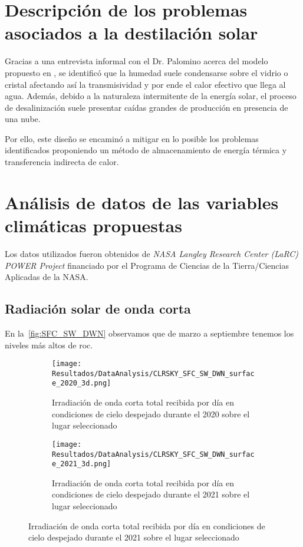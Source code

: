 	\section{Descripción de los problemas asociados a la destilación solar}
		
		Gracias a una entrevista informal con el Dr. Palomino acerca del modelo propuesto en \cite{palomino-resendiz_design_2018}, se identificó que la humedad suele condensarse sobre el vidrio o cristal afectando así la transmisividad y por ende el calor efectivo que llega al agua. Además, debido a la naturaleza intermitente de la energía solar, el proceso de desalinización suele presentar caídas grandes de producción en presencia de una nube.
		
		Por ello, este diseño se encaminó a mitigar en lo posible los problemas identificados proponiendo un método de almacenamiento de energía térmica y transferencia indirecta de calor.
	
	\section{Análisis de datos de las variables climáticas propuestas}
	
	Los datos utilizados fueron obtenidos de \textit{NASA Langley Research Center (LaRC) POWER Project} financiado por el Programa de Ciencias de la Tierra/Ciencias Aplicadas de la NASA.
	
		\subsection{Radiación solar de onda corta}
			
			En la~\cref{fig:SFC_SW_DWN} observamos que de marzo a septiembre tenemos los niveles más altos de \acrlong{roc}.
	
			\begin{figure}[H]
				\centering
				\begin{subfigure}[t]{0.45\linewidth}
					\centering
					\texttt{[image: Resultados/DataAnalysis/CLRSKY\_SFC\_SW\_DWN\_surface\_2020\_3d.png]}
					\caption{Irradiación de onda corta total recibida por día en condiciones de cielo despejado durante el 2020 sobre el lugar seleccionado}
					\label{fig:CLRSKY_SFC_SW_DWN_surface_2020_3d}
				\end{subfigure}
				\hfill
				\begin{subfigure}[t]{0.45\linewidth}
					\centering
					\texttt{[image: Resultados/DataAnalysis/CLRSKY\_SFC\_SW\_DWN\_surface\_2021\_3d.png]}
					\caption{Irradiación de onda corta total recibida por día en condiciones de cielo despejado durante el 2021 sobre el lugar seleccionado}
					\label{fig:CLRSKY_SFC_SW_DWN_surface_2021_3d}
				\end{subfigure}
			\end{figure}
			
